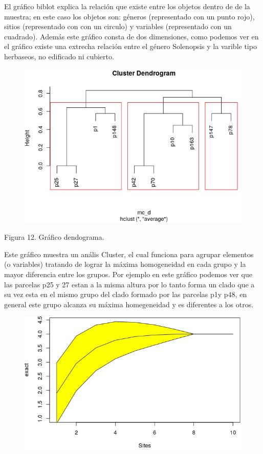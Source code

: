 \documentclass[11pt,]{article}
\begin{document}
El gráfico biblot explica la relación que existe entre los objetos
dentro de de la muestra; en este caso los objetos son: géneros
(representado con un punto rojo), sitios (representado con con un
circulo) y variables (representado con un cuadrado). Además este gráfico
consta de dos dimensiones, como podemos ver en el gráfico existe una
extrecha relación entre el género Solenopsis y la varible tipo
herbaseos, no edificado ni cubierto.

\begin{figure}
\centering
\includegraphics{dendograma.jpg}
\caption{}
\end{figure}

Figura 12. Gráfico dendograma.

Este gráfico muestra un anális Cluster, el cual funciona para agrupar
elementos (o variables) tratando de lograr la máxima homogeneidad en
cada grupo y la mayor diferencia entre los grupos. Por ejemplo en este
gráfico podemos ver que las parcelas p25 y 27 estan a la misma altura
por lo tanto forma un clado que a su vez esta en el mismo grupo del
clado formado por las parcelas p1y p48, en general este grupo alcanza su
máxima homegeneidad y es diferentes a los otros.

\begin{figure}
\centering
\includegraphics{grafico amarillo.jpg}
\caption{}
\end{figure}
\end{document}
